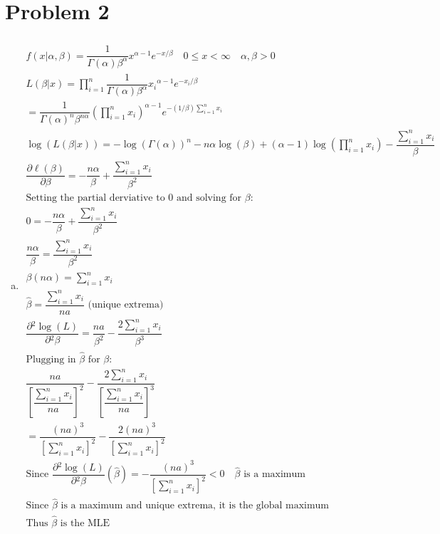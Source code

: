 \documentclass{article}
\newcommand{\pderiv}[2]{\dfrac{\partial{#1}}{\partial{#2}}}
\newcommand{\B}{\beta}
\newcommand{\dll}[1]{\dfrac{\partial \ell({#1})}{\partial{#1}}}
\begin{document}
\begin{flushleft}
\begin{enumerate}[(a)]
\end{enumerate}
\pagebreak
	\section*{Problem 2}
\begin{enumerate}[(a)]
	
	\item 
\begin{multline*}\\
f(x|\alpha,\B)=\dfrac{1}{\Gamma(\alpha)\B^{\alpha}}x^{\alpha-1}e^{-x/\B} \quad 0\leq x<\infty \quad \alpha,\beta>0\\
L(\B|x)=\prod_{i=1}^{n}\dfrac{1}{\Gamma(\alpha)\B^{\alpha}}{x_i}^{\alpha-1}e^{-x_i/\B}\\
=\dfrac{1}{\Gamma(\alpha)^n\B^{n \alpha}}\left(\prod_{i=1}^{n}x_i\right)^{\alpha-1}e^{-(1/\B)\sum_{i=1}^{n}x_i}\\
\log(L(\B|x))=-\log(\Gamma(\alpha))^n- n\alpha \log(\B)+(\alpha-1)\log\left(\prod_{i=1}^{n}x_i\right)-\dfrac{\sum_{i=1}^{n}x_i}{\B}\\
\dll{\B}=-\dfrac{n\alpha}{\B}+\dfrac{\sum_{i=1}^{n}x_i}{\B^2}\\
\text{Setting the partial derviative to 0 and solving for } \B:\\
0=-\dfrac{n\alpha}{\B}+\dfrac{\sum_{i=1}^{n}x_i}{\B^2}\\
\dfrac{n\alpha}{\B}=\dfrac{\sum_{i=1}^{n}x_i}{\B^2}\\
\B(n\alpha)=\sum_{i=1}^{n}x_i\\
\hat{\B}=\dfrac{\sum_{i=1}^{n}x_i}{na} \text{ (unique extrema)}\\
\pderiv{^2\log(L)}{^2\B}=\dfrac{na}{\B^2}-\dfrac{2\sum_{i=1}^{n}x_i}{\B^3}\\
\text{Plugging in } \hat{\B} \text{ for } \B:\\
\dfrac{na}{\left[\dfrac{\sum_{i=1}^{n}x_i}{na}\right]^2}-\dfrac{2\sum_{i=1}^{n}x_i}{\left[\dfrac{\sum_{i=1}^{n}x_i}{na}\right]^3}\\
=\dfrac{(na)^3}{\left[\sum_{i=1}^{n}x_i\right]^2}-\dfrac{2(na)^3}{\left[\sum_{i=1}^{n}x_i\right]^2}\\
\text{Since } \pderiv{^2\log(L)}{^2\B}(\hat{\B})=-\dfrac{(na)^3}{\left[\sum_{i=1}^{n}x_i\right]^2}<0 \quad \hat{\B} \text{ is a maximum}\\
\text{Since } \hat{\B} \text{ is a maximum and unique extrema, it is the global maximum}\\
\text{Thus } \hat{\B} \text{ is the MLE}\\
\end{multline*}


\end{enumerate}
\end{flushleft}
\end{document}
